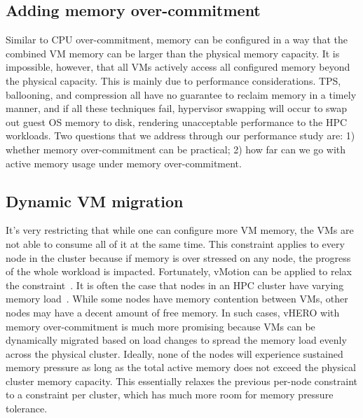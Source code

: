 \subsection{Adding memory over-commitment}
Similar to CPU over-commitment, memory can be configured in a way that the combined VM memory can be 
larger than the physical memory capacity. It is impossible, however, that all VMs actively access all configured 
memory beyond the physical capacity. This is mainly due to performance considerations. TPS, ballooning, and 
compression all have no guarantee to reclaim memory in a timely manner, and if all these techniques fail, 
hypervisor swapping will occur to swap out guest OS memory to disk, rendering unacceptable performance to 
the HPC workloads. Two questions that we address through our performance study are: 1) whether memory over-commitment 
can be practical; 2) how far can we go with active memory usage under memory over-commitment.

\subsection{Dynamic VM migration}
It's very restricting that while one can configure more VM memory, the VMs are not able to consume all of it 
at the same time. This constraint applies to every node in the cluster because if memory is over stressed on any 
node, the progress of the whole workload is impacted. 
Fortunately, vMotion can be applied to relax the constraint~\cite{infrastructure2006resource}. 
It is often the case that nodes in an HPC cluster have varying memory load~\cite{gupta2013improving}. While some nodes have memory contention 
between VMs, other nodes may have a decent amount of free memory. In such cases, vHERO with memory over-commitment 
is much more promising because VMs can be dynamically migrated based on load changes to  
spread the memory load evenly across the physical cluster. Ideally, none of the nodes will experience sustained memory pressure as long as 
the total active memory does not exceed the physical cluster memory capacity. This essentially relaxes the previous 
per-node constraint to a constraint per cluster, which has much more room for memory pressure tolerance. 